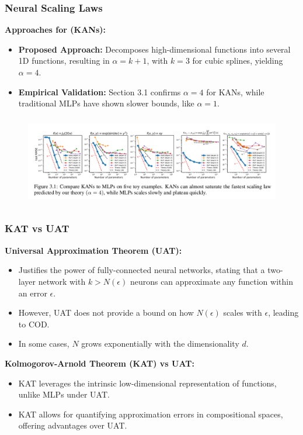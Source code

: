 \documentclass[serif, aspectratio=169]{beamer}
\begin{document}
\begin{frame}
    \frametitle<presentation>{Neural Scaling Laws}
    \textbf{Approaches for (KANs):}
    \begin{itemize}
        \item \textbf{Proposed Approach:} Decomposes high-dimensional functions into several 1D functions, resulting in \( \alpha = k + 1 \), with \( k = 3 \) for cubic splines, yielding \( \alpha = 4 \).
        \item \textbf{Empirical Validation:} Section 3.1 confirms \( \alpha = 4 \) for KANs, while traditional MLPs have shown slower bounds, like \( \alpha = 1 \).
    \end{itemize}
    \begin{figure}
        \centering
        \includegraphics[height=4cm]{image copy 18.png}
    \end{figure}
\end{frame}
\begin{frame}
    \frametitle<presentation>{KAT vs UAT}
    \textbf{Universal Approximation Theorem (UAT):}
    \begin{itemize}
        \item Justifies the power of fully-connected neural networks, stating that a two-layer network with \( k > N(\epsilon) \) neurons can approximate any function within an error \( \epsilon \).
        \item However, UAT does not provide a bound on how \( N(\epsilon) \) scales with \( \epsilon \), leading to COD.
        \item In some cases, \( N \) grows exponentially with the dimensionality \( d \).
    \end{itemize}

    \textbf{Kolmogorov-Arnold Theorem (KAT) vs UAT:}
    \begin{itemize}
        \item KAT leverages the intrinsic low-dimensional representation of functions, unlike MLPs under UAT.
        \item KAT allows for quantifying approximation errors in compositional spaces, offering advantages over UAT.
    \end{itemize}
\end{frame}
\end{document}
